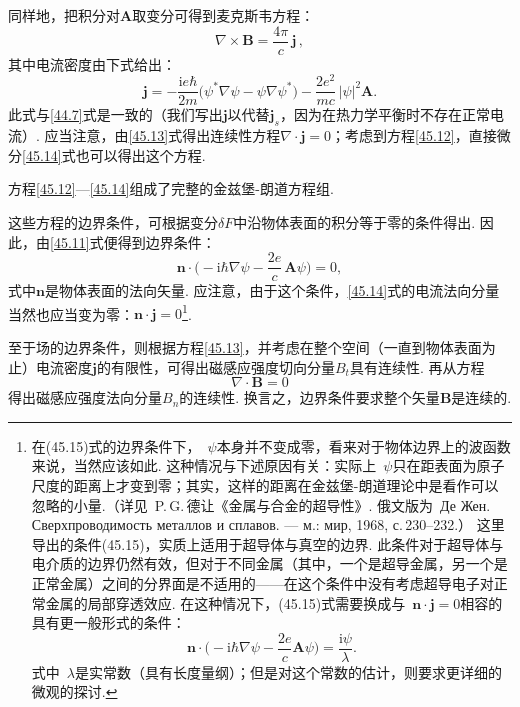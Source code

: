 同样地，把积分对$\bm A$取变分可得到麦克斯韦方程：
\begin{equation}
\nabla\times\bm B = \frac{4\pi}{c}\,\bm j\,,
\label{45.13}
\end{equation}
其中电流密度由下式给出：
\begin{equation}
\bm j = -\frac{\mathrm ie\hbar}{2m}\bigl(\psi^{*}\nabla\psi - \psi\nabla\psi^{*}\bigr)
- \frac{2e^2}{mc}\,|\psi|^2\bm A.
\label{45.14}
\end{equation}
此式与\eqref{44.7}式是一致的（我们写出$\bm j$以代替$\bm j_s$，因为在热力学平衡时不存在正常电流）. 应当注意，由\eqref{45.13}式得出连续性方程$\nabla\cdot\bm j=0$；考虑到方程\eqref{45.12}，直接微分\eqref{45.14}式也可以得出这个方程.

方程\eqref{45.12}—\eqref{45.14}组成了完整的金兹堡-朗道方程组.

这些方程的边界条件，可根据变分$\delta F$中沿物体表面的积分等于零的条件得出. 因此，由\eqref{45.11}式便得到边界条件：
\begin{equation}
\bm n\cdot\Biggl(-\mathrm i\hbar\nabla\psi - \frac{2e}{c}\,\bm A\psi\Biggr) = 0,
\label{45.15}
\end{equation}
式中$\bm n$是物体表面的法向矢量. 应注意，由于这个条件，\eqref{45.14}式的电流法向分量当然也应当变为零：$\bm n\cdot\bm j=0$\footnote{在(45.15)式的边界条件下，~$\psi$本身并不变成零，看来对于物体边界上的波函数来说，当然应该如此. 这种情况与下述原因有关：实际上~$\psi$只在距表面为原子尺度的距离上才变到零；其实，这样的距离在金兹堡-朗道理论中是看作可以忽略的小量.（详见~P.\,G.\,德让《金属与合金的超导性》. 俄文版为~Де Жен. Сверхпроводимость металлов и сплавов. — м.: мир, 1968, с.\,230--232.）
这里导出的条件(45.15)，实质上适用于超导体与真空的边界. 此条件对于超导体与电介质的边界仍然有效，但对于不同金属（其中，一个是超导金属，另一个是正常金属）之间的分界面是不适用的——在这个条件中没有考虑超导电子对正常金属的局部穿透效应. 在这种情况下，(45.15)式需要换成与~$\bm n\cdot\bm j=0$相容的具有更一般形式的条件：
\begin{equation*}
\bm n\cdot\Biggl(-\mathrm i\hbar\nabla\psi-\frac{2e}{c}\bm A\psi\Biggr)=\frac{\mathrm i\psi}{\lambda}.
\tag{45.15a}
\end{equation*}
式中~$\lambda$是实常数（具有长度量纲）；但是对这个常数的估计，则要求更详细的微观的探讨.}.

至于场的边界条件，则根据方程\eqref{45.13}，并考虑在整个空间（一直到物体表面为止）电流密度$\bm j$的有限性，可得出磁感应强度切向分量$B_t$具有连续性. 再从方程
\begin{equation*}
\nabla\cdot\bm B = 0
\end{equation*}
得出磁感应强度法向分量$B_n$的连续性. 换言之，边界条件要求整个矢量$\bm B$是连续的.

